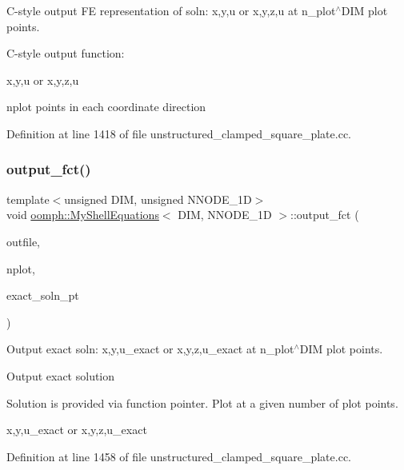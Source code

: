 C-\/style output FE representation of soln\+: x,y,u or x,y,z,u at n\+\_\+plot$^\wedge$\+D\+IM plot points. 

C-\/style output function\+:

x,y,u or x,y,z,u

nplot points in each coordinate direction 

Definition at line 1418 of file unstructured\+\_\+clamped\+\_\+square\+\_\+plate.\+cc.

\mbox{\label{classoomph_1_1MyShellEquations_a882f6447d8e204962a3f2a350c6315c4}} 
\subsubsection{\texorpdfstring{output\+\_\+fct()}{output\_fct()}\hspace{0.1cm}{\footnotesize\ttfamily [1/2]}}
{\footnotesize\ttfamily template$<$unsigned D\+IM, unsigned N\+N\+O\+D\+E\+\_\+1D$>$ \\
void \hyperlink{classoomph_1_1MyShellEquations}{oomph\+::\+My\+Shell\+Equations}$<$ D\+IM, N\+N\+O\+D\+E\+\_\+1D $>$\+::output\+\_\+fct (\begin{DoxyParamCaption}\item[{std\+::ostream \&}]{outfile,  }\item[{const unsigned \&}]{nplot,  }\item[{Finite\+Element\+::\+Steady\+Exact\+Solution\+Fct\+Pt}]{exact\+\_\+soln\+\_\+pt }\end{DoxyParamCaption})}



Output exact soln\+: x,y,u\+\_\+exact or x,y,z,u\+\_\+exact at n\+\_\+plot$^\wedge$\+D\+IM plot points. 

Output exact solution

Solution is provided via function pointer. Plot at a given number of plot points.

x,y,u\+\_\+exact or x,y,z,u\+\_\+exact 

Definition at line 1458 of file unstructured\+\_\+clamped\+\_\+square\+\_\+plate.\+cc.

\mbox{\label{classoomph_1_1MyShellEquations_a7022e91eaf4bff9044e46549bbe0c3f5}} 
